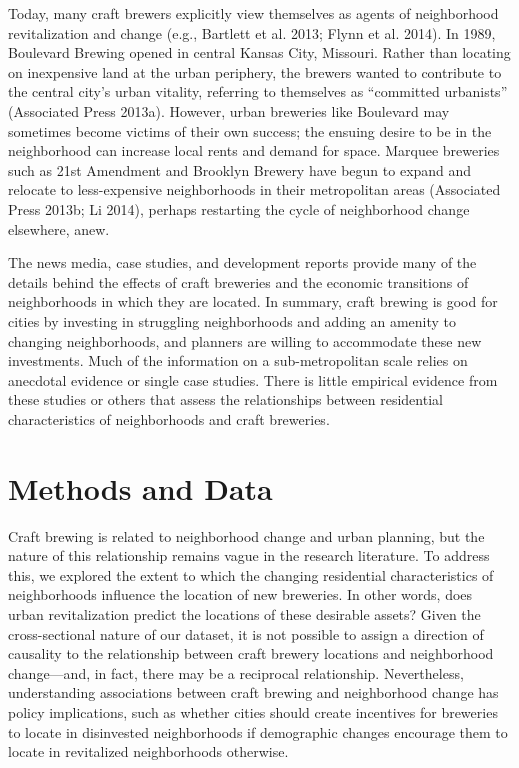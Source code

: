 \documentclass[]{article}
\begin{document}
Today, many craft brewers explicitly view themselves as agents of
neighborhood revitalization and change (e.g., Bartlett et al. 2013;
Flynn et al. 2014). In 1989, Boulevard Brewing opened in central Kansas
City, Missouri. Rather than locating on inexpensive land at the urban
periphery, the brewers wanted to contribute to the central city's urban
vitality, referring to themselves as ``committed urbanists'' (Associated
Press 2013a). However, urban breweries like Boulevard may sometimes
become victims of their own success; the ensuing desire to be in the
neighborhood can increase local rents and demand for space. Marquee
breweries such as 21st Amendment and Brooklyn Brewery have begun to
expand and relocate to less-expensive neighborhoods in their
metropolitan areas (Associated Press 2013b; Li 2014), perhaps restarting
the cycle of neighborhood change elsewhere, anew.

The news media, case studies, and development reports provide many of
the details behind the effects of craft breweries and the economic
transitions of neighborhoods in which they are located. In summary,
craft brewing is good for cities by investing in struggling
neighborhoods and adding an amenity to changing neighborhoods, and
planners are willing to accommodate these new investments. Much of the
information on a sub-metropolitan scale relies on anecdotal evidence or
single case studies. There is little empirical evidence from these
studies or others that assess the relationships between residential
characteristics of neighborhoods and craft breweries.

\section{Methods and Data}\label{methods-and-data}

Craft brewing is related to neighborhood change and urban planning, but
the nature of this relationship remains vague in the research
literature. To address this, we explored the extent to which the
changing residential characteristics of neighborhoods influence the
location of new breweries. In other words, does urban revitalization
predict the locations of these desirable assets? Given the
cross-sectional nature of our dataset, it is not possible to assign a
direction of causality to the relationship between craft brewery
locations and neighborhood change---and, in fact, there may be a
reciprocal relationship. Nevertheless, understanding associations
between craft brewing and neighborhood change has policy implications,
such as whether cities should create incentives for breweries to locate
in disinvested neighborhoods if demographic changes encourage them to
locate in revitalized neighborhoods otherwise.
\end{document}
